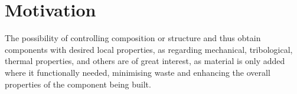 %
\section{Motivation}
The possibility of controlling composition or structure and thus obtain
components with desired local properties, as regarding mechanical, tribological,
thermal properties, and others are of great interest, as material is only added
where it functionally needed, minimising waste and enhancing the overall
properties of the component being built.


